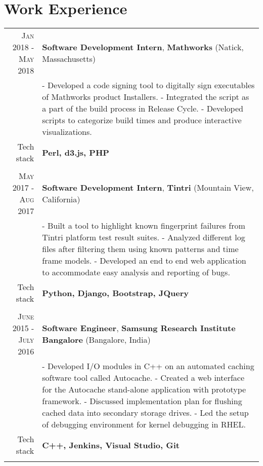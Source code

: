 \section {Work Experience}
\renewcommand{\arraystretch}{0.95}%
\begin{tabular}{r|p{14cm}}

\textsc {Jan 2018 - May 2018} & \textbf{Software Development Intern}, \textbf{Mathworks} (Natick, Massachusetts)\\
& \small{
- Developed a code signing tool to digitally sign executables of Mathworks product Installers. \newline
- Integrated the script as a part of the build process in Release Cycle.\newline
- Developed scripts to categorize build times and produce interactive visualizations.} \\
\small{Tech stack} &\footnotesize{\textbf{Perl, d3.js, PHP}} \\
\multicolumn{2}{c}{} \\

\textsc {May 2017 - Aug 2017} & \textbf{Software Development Intern}, \textbf{Tintri} (Mountain View, California)\\
& \small{
- Built a tool to highlight known fingerprint failures from Tintri platform test result suites. \newline
- Analyzed different log files after filtering them using known patterns and time frame models.\newline
- Developed an end to end web application to accommodate easy analysis and reporting of bugs.} \\
\small{Tech stack} &\footnotesize{\textbf{Python, Django, Bootstrap, JQuery}} \\
\multicolumn{2}{c}{} \\

\textsc {June 2015 - July 2016} & \textbf{Software Engineer}, \textbf{Samsung Research Institute Bangalore} (Bangalore, India) \\
& \small{
- Developed I/O modules in C++ on an automated caching software tool called Autocache.\newline
- Created a web interface for the Autocache stand-alone application with prototype framework.\newline
- Discussed implementation plan for flushing cached data into secondary storage drives.\newline
- Led the setup of debugging environment for kernel debugging in RHEL.}\\
\small{Tech stack} &\footnotesize{\textbf{C++, Jenkins, Visual Studio, Git}} \\
\multicolumn{2}{c}{} \\



\end{tabular}
